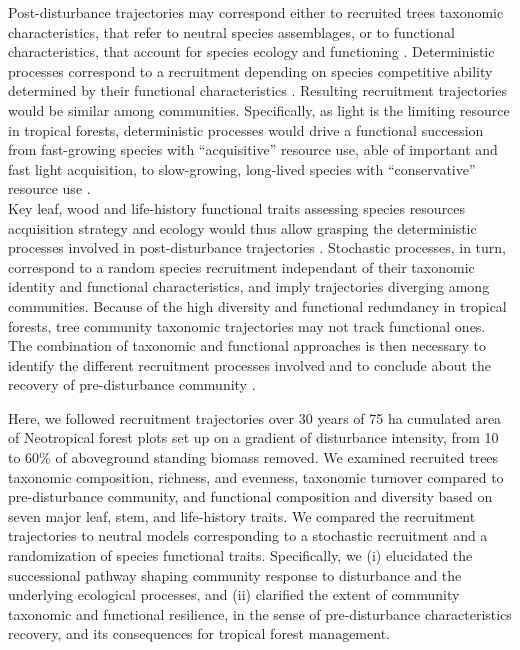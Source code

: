 \documentclass[fleqn,10pt]{ArtEcoFoG} %
\begin{document}
Post-disturbance trajectories may correspond either to recruited trees
taxonomic characteristics, that refer to neutral species assemblages, or
to functional characteristics, that account for species ecology and
functioning \citep{Macarthur1967, Violle2007b, Kunstler2016}.
Deterministic processes correspond to a recruitment depending on species
competitive ability determined by their functional characteristics
\citep{Rees2001, Perronne2017}. Resulting recruitment trajectories would
be similar among communities. Specifically, as light is the limiting
resource in tropical forests, deterministic processes would drive a
functional succession from fast-growing species with ``acquisitive''
resource use, able of important and fast light acquisition, to
slow-growing, long-lived species with ``conservative'' resource use
\citep{Denslow1980, Molino2001, Bongers2009}.\\
Key leaf, wood and life-history functional traits assessing species
resources acquisition strategy and ecology would thus allow grasping the
deterministic processes involved in post-disturbance trajectories
\citep{Wright2004, Chave2009b, Herault2011}. Stochastic processes, in
turn, correspond to a random species recruitment independant of their
taxonomic identity and functional characteristics, and imply
trajectories diverging among communities. Because of the high diversity
and functional redundancy in tropical forests, tree community taxonomic
trajectories may not track functional ones. The combination of taxonomic
and functional approaches is then necessary to identify the different
recruitment processes involved
\citep{Fukami2005, Chalmandrier2015, Cequinel2018} and to conclude about
the recovery of pre-disturbance community
\citep{Clements1916, Diamond1975}.

Here, we followed recruitment trajectories over 30 years of 75 ha
cumulated area of Neotropical forest plots set up on a gradient of
disturbance intensity, from 10 to 60\% of aboveground standing biomass
removed. We examined recruited trees taxonomic composition, richness,
and evenness, taxonomic turnover compared to pre-disturbance community,
and functional composition and diversity based on seven major leaf,
stem, and life-history traits. We compared the recruitment trajectories
to neutral models corresponding to a stochastic recruitment and a
randomization of species functional traits. Specifically, we (i)
elucidated the successional pathway shaping community response to
disturbance and the underlying ecological processes, and (ii) clarified
the extent of community taxonomic and functional resilience, in the
sense of pre-disturbance characteristics recovery, and its consequences
for tropical forest management.
\end{document}
